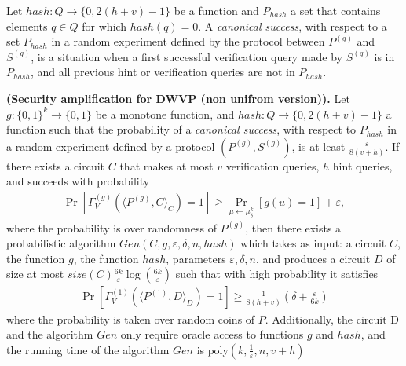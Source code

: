 Let $hash : Q \rightarrow \{0, 2(h+v)-1 \}$ be a function and $P_{hash}$ a set that contains elements $q \in Q$ for which $hash(q) = 0$.
A \textit{canonical success}, with respect to a set $P_{hash}$ in
a random experiment defined by the protocol between $P^{(g)}$ and $S^{(g)}$,
is a situation when a first successful verification query made by $S^{(g)}$ is in $P_{hash}$,
and all previous hint or verification queries are not in $P_{hash}$.
%
%
\begin{theorem} {\textbf{(Security amplification for DWVP (non unifrom version)).}}
  Let $g: \{0,1\}^k \rightarrow \{0,1\}$ be a monotone function, and $hash:Q \rightarrow \{0,2(h+v)-1\}$ a function such that
  the probability of a \textit{canonical success}, with respect to $P_{hash}$ in a random experiment defined by a protocol $(P^{(g)},S^{(g)})$, is at least $\frac{\varepsilon}{8\left(v + h\right)}$.
  If there exists a circuit $C$ that makes at most $v$ verification queries, $h$ hint queries,
  and succeeds with probability
  \begin{align}
    \Pr_{}[\Gamma_{V}^{(g)}( \langle P^{(g)},C \rangle_C ) = 1] \geq \Pr_{\mu \leftarrow \mu_{\delta}^{k}}[g(u) = 1] + \varepsilon ,
  \end{align}
  where the probability is over randomness of $P^{(g)}$,
  then there exists a probabilistic algorithm $Gen(C, g, \varepsilon, \delta, n, hash)$ which takes as input: a circuit $C$, the function $g$, the function $hash$,
  parameters $\varepsilon, \delta, n$, and produces a circuit $D$ of size at most $ size(C) \frac{6k}{\varepsilon} \log(\frac{6k}{\varepsilon}) $
  such that with high probability it satisfies
  \begin{align}
    \Pr_{}[\Gamma_V^{(1)} \left( \langle P^{(1)} ,D \rangle_D \right) = 1] \geq \frac{1}{8(h+v)} \left( \delta + \frac{\varepsilon}{6k} \right)
  \end{align}
  where the probability is taken over random coins of $P$.
  Additionally, the circuit D and the algorithm $Gen$ only require oracle access to functions $g$ and $hash$, and the running time of
  the algorithm $Gen$ is $\text{poly}\left(k, \frac{1}{\varepsilon}, n, v+h \right)$
\end{theorem}


